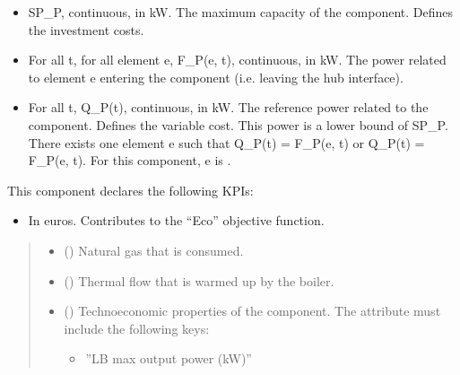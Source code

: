 \documentclass[letterpaper,10pt,english]{sphinxmanual}
\begin{document}
\begin{fulllineitems}
\begin{fulllineitems}
\begin{itemize}
\item {} 
\sphinxAtStartPar
SP\_P, continuous, in kW.
The maximum capacity of the component. Defines the investment costs.

\item {} 
\sphinxAtStartPar
For all t, for all element e, F\_P(e, t), continuous, in kW.
The power related to element e entering the component (i.e. leaving the hub interface).

\item {} 
\sphinxAtStartPar
For all t, Q\_P(t), continuous, in kW.
The reference power related to the component. Defines the variable cost.
This power is a lower bound of SP\_P.
There exists one element e such that Q\_P(t) = F\_P(e, t) or Q\_P(t) = \sphinxhyphen{} F\_P(e, t).
For this component, e is .

\end{itemize}

\sphinxAtStartPar
This component declares the following KPIs:
\begin{itemize}
\item {} 
\sphinxAtStartPar
{}
In euros.
Contributes to the “Eco” objective function.

\end{itemize}
\begin{quote}\begin{description}
\begin{itemize}
\item {} 
\sphinxAtStartPar
{} ({\hyperref[\detokenize{generated/tamos.element.FuelVector:tamos.element.FuelVector}]{}}) \textendash{} Natural gas that is consumed.

\item {} 
\sphinxAtStartPar
{} () \textendash{} Thermal flow that is warmed up by the boiler.

\item {} 
\sphinxAtStartPar
{} (\sphinxstyleliteralemphasis{\sphinxupquote{ | }}) \textendash{} 
\sphinxAtStartPar
Techno\sphinxhyphen{}economic properties of the component.
The  attribute must include the following keys:
\begin{itemize}
\item {} 
\sphinxAtStartPar
”LB max output power (kW)”


\end{itemize}
\end{itemize}
\end{description}
\end{quote}
\end{fulllineitems}
\end{fulllineitems}
\end{document}
